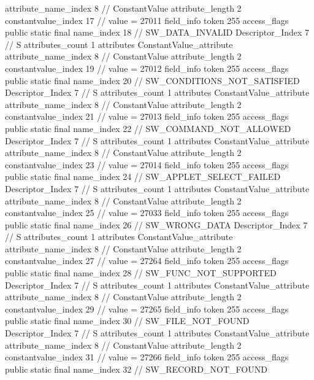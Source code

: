 {{{{{{{					attribute_name_index	8		// ConstantValue
					attribute_length	2
					constantvalue_index	17		// value = 27011
				}
				}
			}
			field_info {
				token	255
				access_flags	public static final
				name_index	18		// SW_DATA_INVALID
				Descriptor_Index	7		// S
				attributes_count	1
				attributes {
				ConstantValue_attribute {
					attribute_name_index	8		// ConstantValue
					attribute_length	2
					constantvalue_index	19		// value = 27012
				}
				}
			}
			field_info {
				token	255
				access_flags	public static final
				name_index	20		// SW_CONDITIONS_NOT_SATISFIED
				Descriptor_Index	7		// S
				attributes_count	1
				attributes {
				ConstantValue_attribute {
					attribute_name_index	8		// ConstantValue
					attribute_length	2
					constantvalue_index	21		// value = 27013
				}
				}
			}
			field_info {
				token	255
				access_flags	public static final
				name_index	22		// SW_COMMAND_NOT_ALLOWED
				Descriptor_Index	7		// S
				attributes_count	1
				attributes {
				ConstantValue_attribute {
					attribute_name_index	8		// ConstantValue
					attribute_length	2
					constantvalue_index	23		// value = 27014
				}
				}
			}
			field_info {
				token	255
				access_flags	public static final
				name_index	24		// SW_APPLET_SELECT_FAILED
				Descriptor_Index	7		// S
				attributes_count	1
				attributes {
				ConstantValue_attribute {
					attribute_name_index	8		// ConstantValue
					attribute_length	2
					constantvalue_index	25		// value = 27033
				}
				}
			}
			field_info {
				token	255
				access_flags	public static final
				name_index	26		// SW_WRONG_DATA
				Descriptor_Index	7		// S
				attributes_count	1
				attributes {
				ConstantValue_attribute {
					attribute_name_index	8		// ConstantValue
					attribute_length	2
					constantvalue_index	27		// value = 27264
				}
				}
			}
			field_info {
				token	255
				access_flags	public static final
				name_index	28		// SW_FUNC_NOT_SUPPORTED
				Descriptor_Index	7		// S
				attributes_count	1
				attributes {
				ConstantValue_attribute {
					attribute_name_index	8		// ConstantValue
					attribute_length	2
					constantvalue_index	29		// value = 27265
				}
				}
			}
			field_info {
				token	255
				access_flags	public static final
				name_index	30		// SW_FILE_NOT_FOUND
				Descriptor_Index	7		// S
				attributes_count	1
				attributes {
				ConstantValue_attribute {
					attribute_name_index	8		// ConstantValue
					attribute_length	2
					constantvalue_index	31		// value = 27266
				}
				}
			}
			field_info {
				token	255
				access_flags	public static final
				name_index	32		// SW_RECORD_NOT_FOUND
}}}}}
